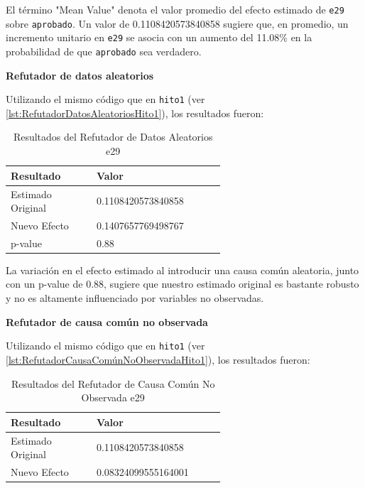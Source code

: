 El término "Mean Value" denota el valor promedio del efecto estimado de \texttt{e29} sobre \texttt{aprobado}. Un valor de 0.1108420573840858 sugiere que, en promedio, un incremento unitario en \texttt{e29} se asocia con un aumento del 11.08\% en la probabilidad de que \texttt{aprobado} sea verdadero.

\textbf{Refutador de datos aleatorios}

Utilizando el mismo código que en \texttt{hito1} (ver \ref{lst:RefutadorDatosAleatoriosHito1}), los resultados fueron:

\begin{table}[H]
    \centering        
    \begin{tabular}{lp{0.6\linewidth}}
        \toprule
        \textbf{Resultado} & \textbf{Valor} \\
        \midrule
        Estimado Original & 0.1108420573840858 \\
        Nuevo Efecto & 0.1407657769498767 \\
        p-value & 0.88 \\
        \bottomrule
    \end{tabular}
    \caption{Resultados del Refutador de Datos Aleatorios e29}
    \label{tab:refutador_datos_aleatorios_e29}
\end{table}

La variación en el efecto estimado al introducir una causa común aleatoria, junto con un p-value de 0.88, sugiere que nuestro estimado original es bastante robusto y no es altamente influenciado por variables no observadas.

\textbf{Refutador de causa común no observada}

Utilizando el mismo código que en \texttt{hito1} (ver \ref{lst:RefutadorCausaComúnNoObservadaHito1}), los resultados fueron:

\begin{table}[H]
    \centering
    \begin{tabular}{lp{0.6\linewidth}}
        \toprule
        \textbf{Resultado} & \textbf{Valor} \\
        \midrule
        Estimado Original & 0.1108420573840858 \\
        Nuevo Efecto & 0.08324099555164001 \\
        \bottomrule
    \end{tabular}
    \caption{Resultados del Refutador de Causa Común No Observada e29}
    \label{tab:refutador_causa_no_observada_e29}
\end{table}

